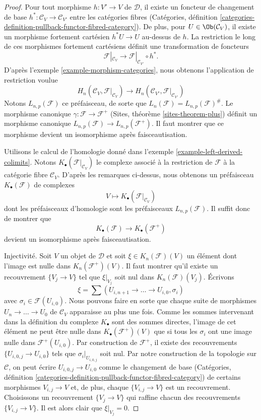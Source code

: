 \begin{proof}
Pour tout morphisme $h : V' \to V$ de $\mathcal{D}$, il existe un
foncteur de changement de base $h^* : \mathcal{C}_V \to \mathcal{C}_{V'}$ entre les
catégories fibres (Catégories, définition
\ref{categories-definition-pullback-functor-fibred-category}).
De plus, pour $U \in \Ob(\mathcal{C}_V)$, il existe un
morphisme fortement cartésien $h^*U \to U$ au-dessus de $h$.
La restriction le long de ces morphismes fortement cartésiens définit une
transformation de foncteurs
$$
\mathcal{F}|_{\mathcal{C}_V}
\longrightarrow
\mathcal{F}|_{\mathcal{C}_{V'}} \circ h^*.
$$
D'après l'exemple \ref{example-morphism-categories},
nous obtenons l'application de restriction voulue
$$
H_n(\mathcal{C}_V, \mathcal{F}|_{\mathcal{C}_V})
\longrightarrow
H_n(\mathcal{C}_{V'}, \mathcal{F}|_{\mathcal{C}_{V'}})
$$
Notons $L_{n, p}(\mathcal{F})$ ce préfaisceau, de sorte que
$L_n(\mathcal{F}) = L_{n, p}(\mathcal{F})^\#$.
Le morphisme canonique $\gamma : \mathcal{F} \to \mathcal{F}^+$
(Sites, théorème \ref{sites-theorem-plus})
définit un morphisme
canonique $L_{n, p}(\mathcal{F}) \to L_{n, p}(\mathcal{F}^+)$.
Il faut montrer que ce morphisme devient un isomorphisme après faisceautisation.

\medskip\noindent
Utilisons le calcul de l'homologie donné dans
l'exemple \ref{example-left-derived-colimits}. Notons
$K_\bullet(\mathcal{F}|_{\mathcal{C}_V})$ le complexe associé à
la restriction de $\mathcal{F}$ à la catégorie fibre $\mathcal{C}_V$.
D'après les remarques ci-dessus, nous obtenons un préfaisceau $K_\bullet(\mathcal{F})$
de complexes
$$
V \longmapsto K_\bullet(\mathcal{F}|_{\mathcal{C}_V})
$$
dont les préfaisceaux d'homologie sont les préfaisceaux $L_{n, p}(\mathcal{F})$.
Il suffit donc de montrer que
$$
K_\bullet(\mathcal{F}) \longrightarrow K_\bullet(\mathcal{F}^+)
$$
devient un isomorphisme après faisceautisation.

\medskip\noindent
Injectivité. Soit $V$ un objet de $\mathcal{D}$ et soit
$\xi \in K_n(\mathcal{F})(V)$ un élément dont l'image
est nulle dans $K_n(\mathcal{F}^+)(V)$. Il faut montrer qu'il existe un
recouvrement $\{V_j \to V\}$ tel que $\xi|_{V_j}$ soit nul dans
$K_n(\mathcal{F})(V_j)$. Écrivons
$$
\xi = \sum (U_{i, n + 1} \to \ldots \to U_{i, 0}, \sigma_i)
$$
avec $\sigma_i \in \mathcal{F}(U_{i, 0})$. Nous pouvons faire en sorte que
chaque suite de morphismes $U_n \to \ldots \to U_0$ de $\mathcal{C}_V$
apparaisse au plus une fois. Comme les sommes intervenant dans la définition
du complexe $K_\bullet$ sont des sommes directes, l'image de cet élément ne peut
être nulle dans $K_\bullet(\mathcal{F}^+)(V)$ que si tous les $\sigma_i$ ont une image
nulle dans $\mathcal{F}^+(U_{i, 0})$. Par construction de
$\mathcal{F}^+$, il existe des recouvrements $\{U_{i, 0, j} \to U_{i, 0}\}$
tels que $\sigma_i|_{U_{i, 0, j}}$ soit nul. Par notre construction de
la topologie sur $\mathcal{C}$, on peut écrire $U_{i, 0, j} \to U_{i, 0}$
comme le changement de base (Catégories, définition
\ref{categories-definition-pullback-functor-fibred-category})
de certains morphismes $V_{i, j} \to V$ et, de plus, chaque
$\{V_{i, j} \to V\}$ est un recouvrement. Choisissons un recouvrement
$\{V_j \to V\}$ qui raffine chacun des recouvrements $\{V_{i, j} \to V\}$.
Il est alors clair que $\xi|_{V_j} = 0$.


\end{proof}
